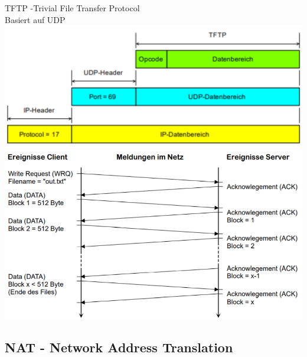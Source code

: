 \begin{definition}{TFTP -Trivial File Transfer Protocol}\\
    Basiert auf UDP\\
        \includegraphics[width=1\linewidth]{images/tftp1.png}\\
        \includegraphics[width=1\linewidth]{images/tftp2.png}
\end{definition}

\subsection{NAT - Network Address Translation}

